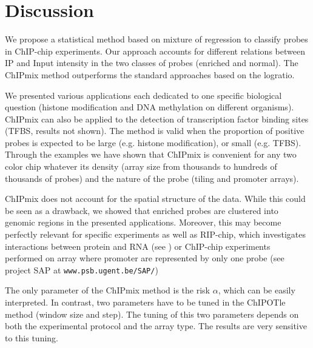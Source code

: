 \documentclass{bioinfo}
\begin{document}


\section{Discussion}\label{discu}
We propose a statistical method based on mixture of regression to
classify probes in ChIP-chip experiments. Our approach accounts for
different relations between IP and Input intensity in the two
classes of probes (enriched and normal). The ChIPmix method
outperforms the standard approaches based on the logratio.

We presented various applications each dedicated to one specific
biological question (histone modification and DNA methylation on
different organisms). ChIPmix can also be applied to the detection
of transcription factor binding sites (TFBS, results not shown). The
method is valid when the proportion of positive probes is expected
to be large (e.g. histone modification), or small (e.g. TFBS).
Through the examples we have shown that ChIPmix is convenient for
any two color chip whatever its density (array size from thousands
to hundreds of thousands of probes) and the nature of the probe
(tiling and promoter arrays).

ChIPmix does not account for the spatial structure of the data.
While this could be seen as a drawback, we showed that enriched
probes are clustered into genomic regions in the presented
applications. Moreover, this may become perfectly relevant for
specific experiments as well as RIP-chip, which investigates
interactions between protein and RNA (see
\cite{Schmitz-Linneweber05}) or ChIP-chip experiments performed on
array where promoter are represented by only one probe (see project
SAP at {\tt www.psb.ugent.be/SAP/})

The only parameter of the ChIPmix method is the risk $\alpha$, which
can be easily interpreted. In contrast, two parameters have to be
tuned in the ChIPOTle method (window size and step). The tuning of
this two parameters depends on both the experimental protocol and
the array type. The results are very sensitive to this tuning.
\end{document}
